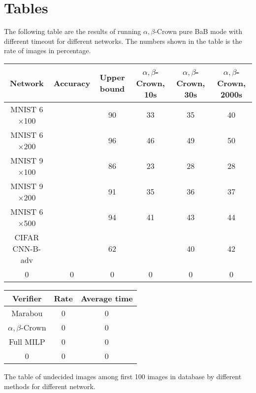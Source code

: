 



\section*{Tables}

The following table are the results of running $\alpha,\beta$-Crown pure BaB mode with different timeout for different networks. The numbers shown in the table is the rate of images in percentage.

\begin{tabular}{|c|c|c|c|c|c|}
	\hline
	Network & Accuracy & Upper bound & $\alpha,\beta$-Crown, 10s & $\alpha,\beta$-Crown, 30s & $\alpha,\beta$-Crown, 2000s  \\ \hline
	MNIST 6$\times$100 &  & 90 & 33 & 35 & 40   \\ \hline
	MNIST 6$\times$200 &   & 96  & 46  & 49  & 50   \\ \hline
	MNIST 9$\times$100 &   & 86  & 23  & 28  & 28   \\ \hline
	MNIST 9$\times$200 &   & 91  & 35  & 36  & 37   \\ \hline
	MNIST 6$\times$500 &   & 94  & 41  & 43  & 44   \\ \hline
	CIFAR CNN-B-adv &   & 62  &   & 40  & 42   \\ \hline
	0 & 0 & 0 & 0 & 0 & 0  \\ \hline
\end{tabular}

\vspace*{4ex}
\begin{tabular}{|c|c|c|}
	\hline
	Verifier & Rate & Average time \\ \hline
	Marabou & 0 & 0 \\ \hline
	$\alpha,\beta$-Crown & 0 & 0 \\ \hline
	Full MILP & 0 & 0 \\ \hline
	0 & 0 & 0 \\ \hline
\end{tabular}



\vspace*{4ex}

The table of undecided images among first 100 images in database by different methods for different network.

